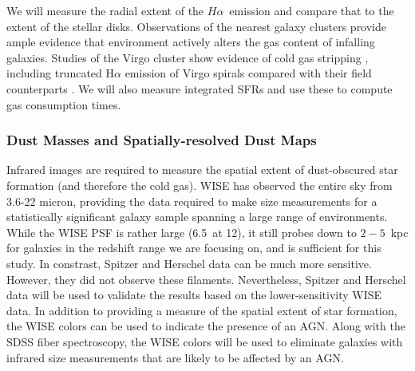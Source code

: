 \documentclass[12pt, preprint]{aastex}
\newcommand{\ha}{$H\alpha$}
\begin{document}
{%


We will measure the radial extent of the \ha \ emission and compare
that to the extent of the stellar disks.
Observations of the nearest galaxy clusters provide 
ample evidence that environment actively alters the gas content of infalling galaxies.  
Studies of the Virgo cluster show evidence of cold gas stripping
\citep[e.g.][]{koopmann98, koopmann04, dale01, crowl05, chung07,
  corbelli12}, including truncated H$\alpha$ emission of Virgo spirals
compared with their field counterparts \citep{koopmann04}.
We will also measure integrated SFRs and use these to compute gas
consumption times.



\vspace*{-1cm}
\subsubsection{Dust Masses and Spatially-resolved Dust Maps}
\vspace*{-.3cm}
\label{wise}
Infrared images are required to measure the spatial extent of
dust-obscured star formation (and therefore the cold gas). WISE has
observed the entire sky from 3.6-22 micron, providing the data required to make 
size measurements for a statistically significant galaxy sample spanning a
large range of environments. While the WISE PSF is rather large
(6.5\arcsec \ at 12\micron), it
still probes down to $2-5$~kpc for galaxies in the redshift range we are
focusing on, and is sufficient for this study. In constrast, Spitzer
and Herschel data can be much more sensitive. However, they did not
observe these filaments. Nevertheless, Spitzer and Herschel data will be used to validate the
results based on the lower-sensitivity WISE data. In addition to
providing a measure of the spatial extent of star formation, the WISE
colors can be used to indicate the presence of an AGN.  Along with the SDSS fiber
spectroscopy, the WISE colors will be used to eliminate galaxies with
infrared size measurements that are likely to be affected by an AGN.


}
\end{document}
